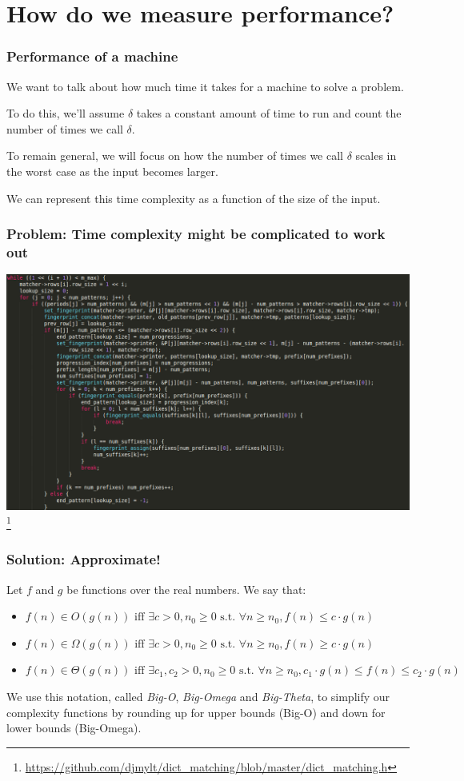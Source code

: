 \documentclass[aspectratio=169]{beamer}
\begin{document}
\section{How do we measure performance?}

\begin{frame}
\frametitle{Performance of a machine}
We want to talk about how much time it takes for a machine to solve a problem.

To do this, we'll assume $\delta$ takes a constant amount of time to run and count the number of times we call $\delta$.

To remain general, we will focus on how the number of times we call $\delta$ scales in the worst case as the input becomes larger.

We can represent this time complexity as a function of the size of the input.
\end{frame}

\begin{frame}
\frametitle{Problem: Time complexity might be complicated to work out}
\includegraphics[scale=0.25]{complex_code}\footnote{\url{https://github.com/djmylt/dict_matching/blob/master/dict_matching.h}}
\end{frame}

\begin{frame}
\frametitle{Solution: Approximate!}
Let $f$ and $g$ be functions over the real numbers. We say that:

\begin{itemize}
\item<1->$f(n) \in O(g(n)) \text{ iff } \exists c > 0, n_0 \geq 0 \text{ s.t. } \forall n \geq n_0, f(n) \leq c \cdot g(n)$

\item<2->$f(n) \in \Omega(g(n)) \text{ iff } \exists c > 0, n_0 \geq 0 \text{ s.t. } \forall n \geq n_0, f(n) \geq c \cdot g(n)$

\item<3->$f(n) \in \Theta(g(n)) \text{ iff } \exists c_1, c_2 > 0, n_0 \geq 0 \text{ s.t. } \forall n \geq n_0, c_1 \cdot g(n) \leq f(n) \leq c_2 \cdot g(n)$
\end{itemize}

We use this notation, called {\em Big-O}, {\em Big-Omega} and {\em Big-Theta}, to simplify our complexity functions by rounding up for upper bounds (Big-O) and down for lower bounds (Big-Omega).
\end{frame}
\end{document}
